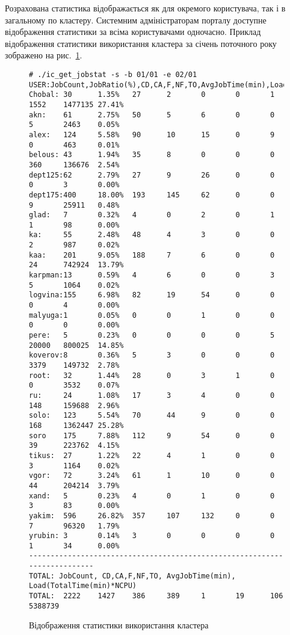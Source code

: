 Розрахована статистика відображається як для окремого користувача, так і в загальному по кластеру. Системним адміністраторам порталу доступне відображення статистики за всіма користувачами одночасно. Приклад відображення статистики використання кластера за січень  поточного року зображено на рис.~\ref{fig:job.stat}.

\begin{figure}[!hb]
\begin{lstlisting}
# ./ic_get_jobstat -s -b 01/01 -e 02/01
USER:JobCount,JobRatio(%),CD,CA,F,NF,TO,AvgJobTime(min),Load(TotalTime(min)*NCPU),LoadRatio(%)
Chobal: 30      1.35%   27      2       0       0       1       1552    1477135 27.41%
akn:    61      2.75%   50      5       6       0       0       5       2463    0.05%
alex:   124     5.58%   90      10      15      0       9       0       463     0.01%
belous: 43      1.94%   35      8       0       0       0       360     136676  2.54%
dept125:62      2.79%   27      9       26      0       0       0       3       0.00%
dept175:400     18.00%  193     145     62      0       0       9       25911   0.48%
glad:   7       0.32%   4       0       2       0       1       1       98      0.00%
ka:     55      2.48%   48      4       3       0       0       2       987     0.02%
kaa:    201     9.05%   188     7       6       0       0       24      742924  13.79%
karpman:13      0.59%   4       6       0       0       3       5       1064    0.02%
logvina:155     6.98%   82      19      54      0       0       0       4       0.00%
malyuga:1       0.05%   0       0       1       0       0       0       0       0.00%
pere:   5       0.23%   0       0       0       0       5       20000   800025  14.85%
koverov:8       0.36%   5       3       0       0       0       3379    149732  2.78%
root:   32      1.44%   28      0       3       1       0       0       3532    0.07%
ru:     24      1.08%   17      3       4       0       0       148     159688  2.96%
solo:   123     5.54%   70      44      9       0       0       168     1362447 25.28%
soro    175     7.88%   112     9       54      0       0       39      223762  4.15%
tikus:  27      1.22%   22      4       1       0       0       3       1164    0.02%
vgor:   72      3.24%   61      1       10      0       0       44      204214  3.79%
xand:   5       0.23%   4       0       1       0       0       3       83      0.00%
yakim:  596     26.82%  357     107     132     0       0       7       96320   1.79%
yrubin: 3       0.14%   3       0       0       0       0       1       34      0.00%
--------------------------------------------------------------------------
TOTAL: JobCount, CD,CA,F,NF,TO, AvgJobTime(min), Load(TotalTime(min)*NCPU)
TOTAL:  2222    1427    386     389     1       19      106     5388739
\end{lstlisting}
  \caption{Відображення статистики використання кластера}
 \label{fig:job.stat}
\end{figure}